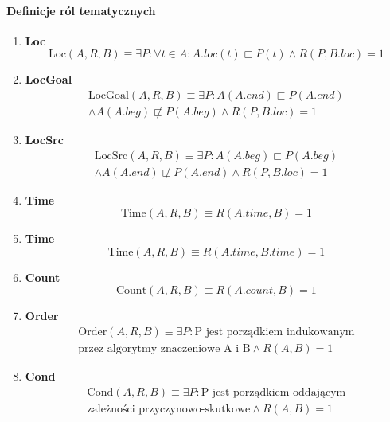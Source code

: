 \documentclass[a4paper, 12pt]{article}
\theoremstyle{remark}
\begin{document}
\paragraph{Definicje ról tematycznych} %
\label{par:role_tematyczne}
\begin{enumerate}
\item \textbf{Loc}
\begin{equation}
\text{Loc}(A,R,B) \equiv \exists P: \forall t \in A: A.loc(t) \sqsubset P(t) \wedge R(P,B.loc)=1
\end{equation}
\item \textbf{LocGoal}
\begin{align}
\nonumber\text{LocGoal}(A,R,B) \equiv \exists P: A(A.end) \sqsubset P(A.end) \\ \wedge A(A.beg) \not\sqsubset P(A.beg) \wedge R(P,B.loc)=1
\end{align}
\item \textbf{LocSrc}
\begin{align}
\nonumber\text{LocSrc}(A,R,B) \equiv \exists P: A(A.beg) \sqsubset P(A.beg) \\ \wedge A(A.end) \not\sqsubset P(A.end) \wedge R(P,B.loc)=1
\end{align}
\item \textbf{Time}
\begin{equation}
\text{Time}(A,R,B) \equiv R(A.time,B)=1
\end{equation}
\item \textbf{Time}
\begin{equation}
\text{Time}(A,R,B) \equiv R(A.time,B.time)=1
\end{equation}
\item \textbf{Count}
\begin{equation}
\text{Count}(A,R,B) \equiv R(A.count,B)=1
\end{equation}
\item \textbf{Order}
\begin{align}
\nonumber\text{Order}(A,R,B) \equiv \exists P: \text{P jest porządkiem indukowanym} \\ \text{przez algorytmy znaczeniowe A i B} \wedge R(A,B)=1
\end{align}
\item \textbf{Cond}
\begin{align}
\nonumber\text{Cond}(A,R,B) \equiv \exists P: \text{P jest porządkiem oddającym} \\ \text{zależności przyczynowo-skutkowe} \wedge R(A,B)=1
\end{align}
\end{enumerate}
\end{document}
